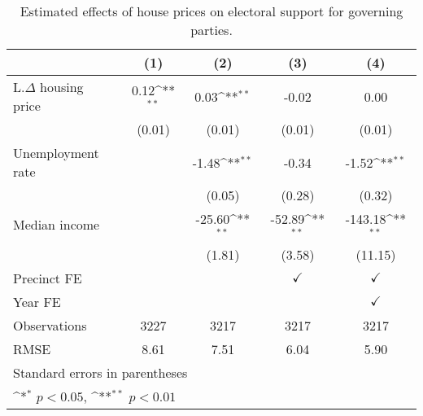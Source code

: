 \begin{table}[htbp]\centering
\def\sym#1{\ifmmode^{#1}\else\(^{#1}\)\fi}
\caption{Estimated effects of house prices on electoral support for governing parties.} \label{tab2}
\begin{tabular}{l*{4}{c}}
\hline\hline
                    &\multicolumn{1}{c}{(1)}        &\multicolumn{1}{c}{(2)}        &\multicolumn{1}{c}{(3)}        &\multicolumn{1}{c}{(4)}        \\
\hline
L.$\Delta$ housing price&        0.12\sym{**}&        0.03\sym{**}&       -0.02        &        0.00        \\
                    &      (0.01)        &      (0.01)        &      (0.01)        &      (0.01)        \\
[1em]
Unemployment rate   &                    &       -1.48\sym{**}&       -0.34        &       -1.52\sym{**}\\
                    &                    &      (0.05)        &      (0.28)        &      (0.32)        \\
[1em]
Median income       &                    &      -25.60\sym{**}&      -52.89\sym{**}&     -143.18\sym{**}\\
                    &                    &      (1.81)        &      (3.58)        &     (11.15)        \\
[1em]
\hline Precinct FE  &                    &                    &$\checkmark$        &$\checkmark$        \\
[1em]
Year FE             &                    &                    &                    &$\checkmark$        \\
\hline
Observations        &        3227        &        3217        &        3217        &        3217        \\
RMSE                &        8.61        &        7.51        &        6.04        &        5.90        \\
\hline\hline
\multicolumn{5}{l}{\footnotesize Standard errors in parentheses}\\
\multicolumn{5}{l}{\footnotesize \sym{*} \(p<0.05\), \sym{**} \(p<0.01\)}\\
\end{tabular}
\end{table}

